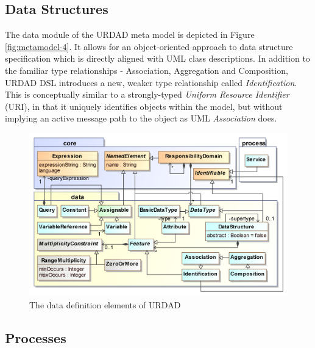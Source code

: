 \subsection{Data Structures}

The data module of the URDAD meta model is depicted in Figure \ref{fig:metamodel-4}. It allows for an object-oriented approach to data structure specification which is directly aligned with UML class descriptions. In addition to the familiar type relationships - Association, Aggregation and Composition, URDAD DSL introduces a new, weaker type relationship called \emph{Identification}. This is conceptually similar to a strongly-typed \emph{Uniform Resource Identifier} (URI), in that it uniquely identifies objects within the model, but without implying an active message path to the object as UML \emph{Association} does.
 
\begin{figure}[Htbp]
  \centering
  \includegraphics{data}
  \caption{The data definition elements of URDAD}
  \label{fig:dataStructureModule}
\end{figure}


\subsection{Processes}

